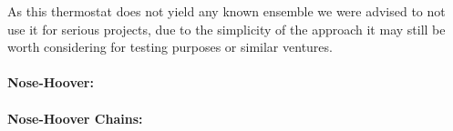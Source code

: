 As this thermostat does not yield any known ensemble we were advised to not use it for serious projects, due to the simplicity of the approach it may still be worth considering for testing purposes or similar ventures.


\paragraph{Nose-Hoover:}
\paragraph{Nose-Hoover Chains:}


